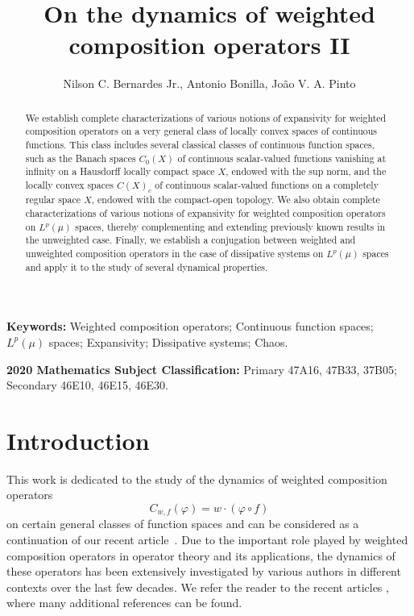 \documentclass[12pt]{article}
\title{On the dynamics of weighted composition operators II}
\author{Nilson C. Bernardes Jr., Antonio Bonilla, Jo\~ao V. A. Pinto}
\date{}
\theoremstyle{plain}
\theoremstyle{definition}
\begin{document}
\maketitle

\begin{abstract}
We establish complete characterizations of various notions of expansivity for weighted composition operators 
on a very general class of locally convex spaces of continuous functions.
This class includes several classical classes of continuous function spaces, 
such as the Banach spaces $C_0(X)$ of continuous scalar-valued functions vanishing at infinity on a Hausdorff locally compact space $X$,
endowed with the sup norm, 
and the locally convex spaces $C(X)_c$ of continuous scalar-valued functions on a completely regular space $X$,
endowed with the compact-open topology.
We also obtain complete characterizations of various notions of expansivity for weighted composition operators on $L^p(\mu)$ spaces,
thereby complementing and extending previously known results in the unweighted case.
Finally, we establish a conjugation between weighted and unweighted composition operators in the case of dissipative systems 
on $L^p(\mu)$ spaces and apply it to the study of several dynamical properties.
\end{abstract}

\bigskip\noindent
{\bf Keywords:} Weighted composition operators; Continuous function spaces; $L^p(\mu)$ spaces; 
Expansivity; Dissipative systems; Chaos.

\bigskip\noindent
{\bf 2020 Mathematics Subject Classification:} Primary 47A16, 47B33, 37B05; Secondary 46E10, 46E15, 46E30.


\section{Introduction}

This work is dedicated to the study of the dynamics of weighted composition operators 
\[
C_{w,f}(\varphi) = w \cdot (\varphi \circ f)
\]
on certain general classes of function spaces and can be considered as a continuation of our recent article~\cite{BerBonPin26}.
Due to the important role played by weighted composition operators in operator theory and its applications, the dynamics of these operators has been extensively investigated by various authors in different contexts over the last few decades.
We refer the reader to the recent articles \cite{CAlvJHen25,AseJorKal25,BerBonPin26,NBerFVas25,KChe24,DGomKGro25},
where many additional references can be found.
\end{document}
